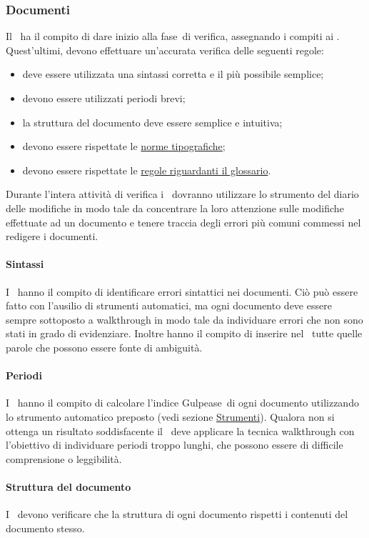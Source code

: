 \documentclass[../NormeProgetto.text]{subfiles}
\begin{document}
	\subsubsection{Documenti}
		Il \responsabilediprogetto\ ha il compito di dare inizio alla fase\g\ di verifica, assegnando i compiti ai \verificatori. Quest'ultimi, devono effettuare un'accurata verifica delle seguenti regole:
		\begin{itemize}
			\item deve essere utilizzata una sintassi corretta e il più possibile semplice;
			\item devono essere utilizzati periodi brevi;
			\item la struttura del documento deve essere semplice e intuitiva;
			\item devono essere rispettate le  \hyperref[sec:Norme tipografiche]{norme tipografiche};
			\item devono essere rispettate le \hyperref[sec:Glossario]{regole riguardanti il glossario}.
		\end{itemize}
		Durante l'intera attività di verifica i \verificatori\ dovranno utilizzare lo strumento del diario delle modifiche in modo tale da concentrare la loro attenzione sulle modifiche effettuate ad un documento e tenere traccia degli errori più comuni commessi nel redigere i documenti.
		\paragraph{Sintassi}
			I \verificatori\ hanno il compito di identificare errori sintattici nei documenti. Ciò può essere fatto con l'ausilio di strumenti automatici, ma ogni documento deve essere sempre sottoposto a walkthrough in modo tale da individuare errori che non sono stati in grado di evidenziare. Inoltre hanno il compito di inserire nel \glossario\ tutte quelle parole che possono essere fonte di ambiguità.
		\paragraph{Periodi}
			I \verificatori\ hanno il compito di calcolare l'indice Gulpease\g\ di ogni documento utilizzando lo strumento automatico preposto (vedi sezione \hyperref[sec:Strumenti]{Strumenti}). Qualora non si ottenga un risultato soddisfacente il \verificatore\ deve applicare la tecnica walkthrough con l'obiettivo di individuare periodi troppo lunghi, che possono essere di difficile comprensione o leggibilità.
		\paragraph{Struttura del documento}
			I \verificatori\ devono verificare che la struttura di ogni documento rispetti i contenuti del documento stesso.
\end{document}
